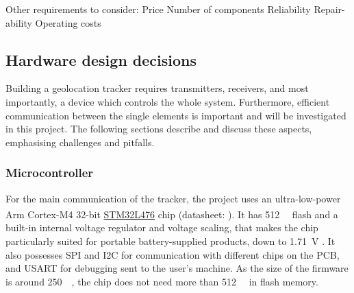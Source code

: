 Other requirements to consider:
Price
Number of components
Reliability
Repair-ability
Operating costs

\subsection{Hardware design decisions}
Building a geolocation tracker requires transmitters, receivers, and most importantly, a device which controls the whole system. Furthermore, efficient communication between the single elements is important and will be investigated in this project. The following sections describe and discuss these aspects, emphasising challenges and pitfalls.

\subsubsection{Microcontroller}
For the main communication of the tracker, the project uses an ultra-low-power Arm\textsuperscript{\textregistered} Cortex\textsuperscript{\textregistered}-M4 32-bit \hyperref[bom:stm32l476]{STM32L476} chip (datasheet: ). It has \SI{512}{\kilo\byte} flash and a built-in internal voltage regulator and voltage scaling, that makes the chip particularly suited for portable battery-supplied products, down to \SI{1.71}{\volt} \cite{STM32L4_application_note}. It also possesses \ac{SPI} and \ac{I2C} for communication with different chips on the \ac{PCB}, and \ac{USART} for debugging sent to the user's machine. As the size of the firmware is around \SI{250}{\kilo\byte}, the chip does not need more than \SI{512}{\kilo\byte} in flash memory.

